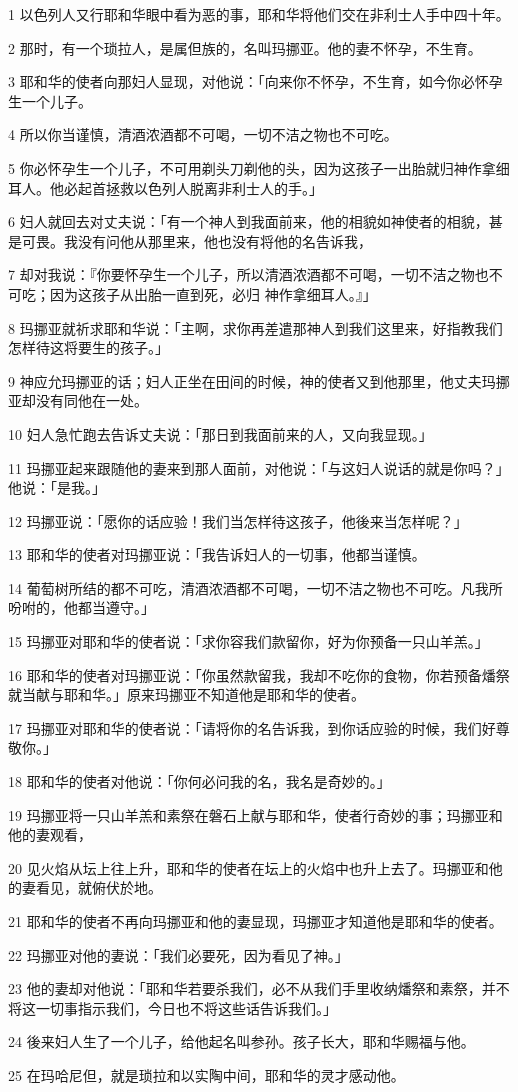 \par 1 以色列人又行耶和华眼中看为恶的事，耶和华将他们交在非利士人手中四十年。
\par 2 那时，有一个琐拉人，是属但族的，名叫玛挪亚。他的妻不怀孕，不生育。
\par 3 耶和华的使者向那妇人显现，对他说：「向来你不怀孕，不生育，如今你必怀孕生一个儿子。
\par 4 所以你当谨慎，清酒浓酒都不可喝，一切不洁之物也不可吃。
\par 5 你必怀孕生一个儿子，不可用剃头刀剃他的头，因为这孩子一出胎就归神作拿细耳人。他必起首拯救以色列人脱离非利士人的手。」
\par 6 妇人就回去对丈夫说：「有一个神人到我面前来，他的相貌如神使者的相貌，甚是可畏。我没有问他从那里来，他也没有将他的名告诉我，
\par 7 却对我说：『你要怀孕生一个儿子，所以清酒浓酒都不可喝，一切不洁之物也不可吃；因为这孩子从出胎一直到死，必归 神作拿细耳人。』」
\par 8 玛挪亚就祈求耶和华说：「主啊，求你再差遣那神人到我们这里来，好指教我们怎样待这将要生的孩子。」
\par 9 神应允玛挪亚的话；妇人正坐在田间的时候，神的使者又到他那里，他丈夫玛挪亚却没有同他在一处。
\par 10 妇人急忙跑去告诉丈夫说：「那日到我面前来的人，又向我显现。」
\par 11 玛挪亚起来跟随他的妻来到那人面前，对他说：「与这妇人说话的就是你吗？」他说：「是我。」
\par 12 玛挪亚说：「愿你的话应验！我们当怎样待这孩子，他後来当怎样呢？」
\par 13 耶和华的使者对玛挪亚说：「我告诉妇人的一切事，他都当谨慎。
\par 14 葡萄树所结的都不可吃，清酒浓酒都不可喝，一切不洁之物也不可吃。凡我所吩咐的，他都当遵守。」
\par 15 玛挪亚对耶和华的使者说：「求你容我们款留你，好为你预备一只山羊羔。」
\par 16 耶和华的使者对玛挪亚说：「你虽然款留我，我却不吃你的食物，你若预备燔祭就当献与耶和华。」原来玛挪亚不知道他是耶和华的使者。
\par 17 玛挪亚对耶和华的使者说：「请将你的名告诉我，到你话应验的时候，我们好尊敬你。」
\par 18 耶和华的使者对他说：「你何必问我的名，我名是奇妙的。」
\par 19 玛挪亚将一只山羊羔和素祭在磐石上献与耶和华，使者行奇妙的事；玛挪亚和他的妻观看，
\par 20 见火焰从坛上往上升，耶和华的使者在坛上的火焰中也升上去了。玛挪亚和他的妻看见，就俯伏於地。
\par 21 耶和华的使者不再向玛挪亚和他的妻显现，玛挪亚才知道他是耶和华的使者。
\par 22 玛挪亚对他的妻说：「我们必要死，因为看见了神。」
\par 23 他的妻却对他说：「耶和华若要杀我们，必不从我们手里收纳燔祭和素祭，并不将这一切事指示我们，今日也不将这些话告诉我们。」
\par 24 後来妇人生了一个儿子，给他起名叫参孙。孩子长大，耶和华赐福与他。
\par 25 在玛哈尼但，就是琐拉和以实陶中间，耶和华的灵才感动他。

